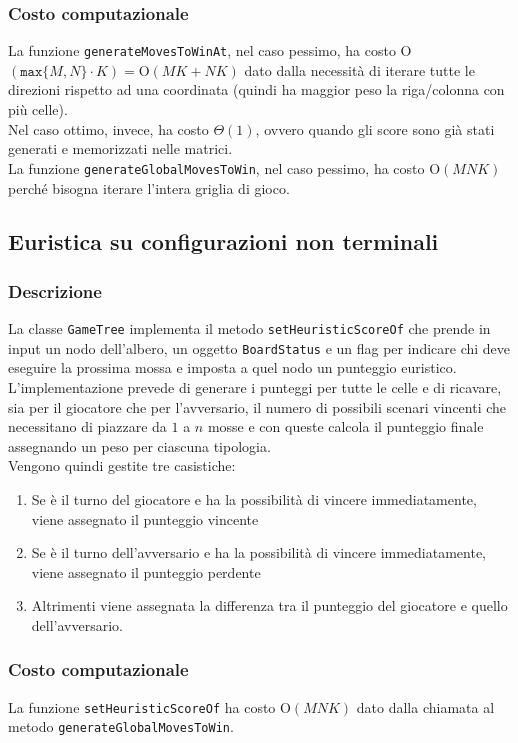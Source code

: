 \documentclass[11pt]{article}
\begin{document}
\subsubsection*{Costo computazionale}
La funzione \texttt{generateMovesToWinAt}, nel caso pessimo, ha costo O$(\texttt{max}\{M, N\} \cdot K) = \text{O}(MK+NK)$ dato dalla necessità di iterare tutte le direzioni rispetto ad una coordinata (quindi ha maggior peso la riga/colonna con più celle).\\
Nel caso ottimo, invece, ha costo $\Theta(1)$, ovvero quando gli score sono già stati generati e memorizzati nelle matrici.\\
La funzione \texttt{generateGlobalMovesToWin}, nel caso pessimo, ha costo O$(MNK)$ perché bisogna iterare l'intera griglia di gioco.

\subsection*{Euristica su configurazioni non terminali}
\subsubsection*{Descrizione}
La classe \texttt{GameTree} implementa il metodo \texttt{setHeuristicScoreOf} che prende in input un nodo dell'albero, un oggetto \texttt{BoardStatus} e un flag per indicare chi deve eseguire la prossima mossa e imposta a quel nodo un punteggio euristico.\\
L'implementazione prevede di generare i punteggi per tutte le celle e di ricavare, sia per il giocatore che per l'avversario, il numero di possibili scenari vincenti che necessitano di piazzare da $1$ a $n$ mosse e con queste calcola il punteggio finale assegnando un peso per ciascuna tipologia.\\
Vengono quindi gestite tre casistiche: 
\begin{enumerate}
\setlength\itemsep{0.05cm}
	\item Se è il turno del giocatore e ha la possibilità di vincere immediatamente, viene assegnato il punteggio vincente
	\item Se è il turno dell'avversario e ha la possibilità di vincere immediatamente, viene assegnato il punteggio perdente
	\item Altrimenti viene assegnata la differenza tra il punteggio del giocatore e quello dell'avversario.
\end{enumerate}
\subsubsection*{Costo computazionale}
La funzione \texttt{setHeuristicScoreOf} ha costo O$(MNK)$ dato dalla chiamata al metodo \texttt{generateGlobalMovesToWin}.
\end{document}
